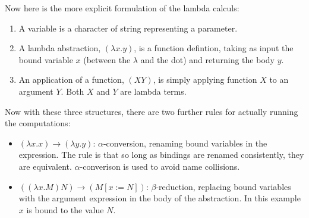 \documentclass{l4proj}
\begin{document}
\begin{table}[!h]
\end{table}

Now here is the more explicit formulation of the lambda calculs:
\begin{enumerate}
    \item A variable is a character of string representing a parameter. 
    \item A lambda abstraction, $(\lambda x . y)$, is a function defintion, taking as input the bound variable $x$ (between the $\lambda$ and the dot) and returning the body $y$.
    \item An application of a function, $(X Y)$, is simply applying function $X$ to an argument $Y$. Both $X$ and $Y$ are lambda terms.
\end{enumerate}

Now with these three structures, there are two further rules for actually running the computations:
\begin{itemize}
    \item $(\lambda x . x) \rightarrow (\lambda y . y)$: $\alpha$-conversion, renaming bound variables in the expression. The rule is that so long as bindings are renamed consistently, they are equivalent. $\alpha$-converison is used to avoid name collisions.
    \item $((\lambda x . M) N) \rightarrow (M [x := N])$: $\beta$-reduction, replacing bound variables with the argument expression in the body of the abstraction. In this example $x$ is bound to the value $N$.
\end{itemize}


\end{document}
